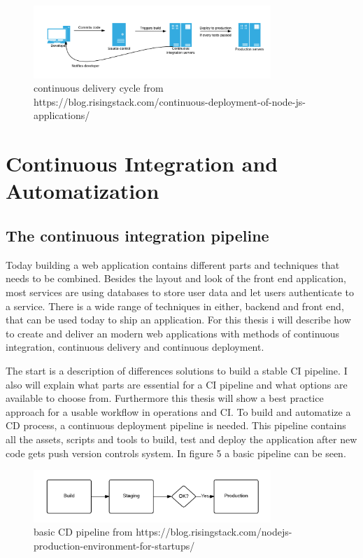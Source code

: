 \begin{figure}[h!]
  \centering
  \includegraphics[width=0.8\textwidth]{images/cd.png}
  \caption{continuous delivery cycle from https://blog.risingstack.com/continuous-deployment-of-node-js-applications/}
\end{figure}

\newpage

\section{Continuous Integration and Automatization}
\label{section:Continuous Integration and Automatization}

\subsection{The continuous integration pipeline}
Today building a web application contains different parts and techniques that needs to be combined. Besides the layout and look of the front end application,
most services are using databases to store user data and let users authenticate to a service. There is a wide range of techniques in either, backend and
front end, that can be used today to ship an application. For this thesis i will describe how to create and deliver an modern web
applications with methods of continuous integration, continuous delivery and continuous deployment.

The start is a description of differences solutions to build a stable CI pipeline. I also will explain what parts are essential for a CI pipeline and what options
are available to choose from. Furthermore this thesis will show a best practice approach for a usable workflow in operations and CI. To build and automatize a CD process,
a continuous deployment pipeline is needed. This pipeline contains all the assets, scripts and tools to build, test and deploy the application after new code gets
push version controls system. In figure 5 a basic pipeline can be seen.


\begin{figure}[h!]
  \centering
  \includegraphics[width=0.8\textwidth]{images/pipeline.png}
  \caption{basic CD pipeline from https://blog.risingstack.com/nodejs-production-environment-for-startups/}
\end{figure}

